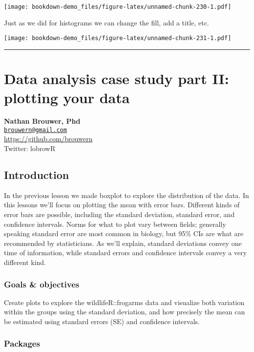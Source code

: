 \documentclass[]{book}
\theoremstyle{definition}
\theoremstyle{definition}
\theoremstyle{definition}
\theoremstyle{remark}
\begin{document}
\texttt{[image: bookdown-demo\_files/figure-latex/unnamed-chunk-230-1.pdf]}

Just as we did for histograms we can change the fill, add a title, etc.

\texttt{[image: bookdown-demo\_files/figure-latex/unnamed-chunk-231-1.pdf]}

\begin{center}\rule{0.5\linewidth}{\linethickness}\end{center}

\chapter{Data analysis case study part II: plotting your
data}\label{data-analysis-case-study-part-ii-plotting-your-data}

\textbf{Nathan Brouwer, Phd}\\
\href{mailto:brouwern@gmail.com}{\nolinkurl{brouwern@gmail.com}}\\
\url{https://github.com/brouwern}\\
Twitter: lobrowR

\section{Introduction}\label{introduction-10}

In the previous lesson we made boxplot to explore the distribution of
the data. In this lessons we'll focus on plotting the mean with error
bars. Different kinds of error bars are possible, including the standard
deviation, standard error, and confidence intervals. Norms for what to
plot vary between fields; generally speaking standard error are most
common in biology, but 95\% CIs are what are recommended by
statisticians. As we'll explain, standard deviations convey one time of
information, while standard errors and confidence intervals convey a
very different kind.

\subsection{Goals \& objectives}\label{goals-objectives-1}

Create plots to explore the wildlifeR::frogarms data and visualize both
variation within the groups using the standard deviation, and how
precisely the mean can be estimated using standard errors (SE) and
confidence intervals.

\subsection{Packages}\label{packages-9}
\end{document}
